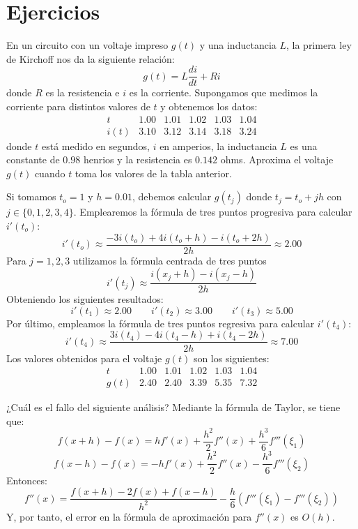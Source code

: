 \section{Ejercicios}
\begin{ejer}
En un circuito con un voltaje impreso $g(t)$ y una inductancia $L$, la primera ley de Kirchoff nos da la siguiente relación:
$$g(t)=L \dfrac{di}{dt}+Ri$$
donde $R$ es la resistencia e $i$ es la corriente. Supongamos que medimos la corriente para distintos valores de $t$ y obtenemos los datos:
$$\begin{array}{c|c|c|c|c|c}
    t & 1.00&1.01 &1.02&1.03&1.04  \\
    \hline
    i(t) & 3.10 &3.12 &3.14&3.18&3.24 
\end{array}$$
donde $t$ está medido en segundos, $i$ en amperios, la inductancia $L$ es una constante de $0.98$ henrios y la resistencia es $0.142$ ohms. Aproxima el voltaje $g(t)$ cuando $t$ toma los valores de la tabla anterior.
\end{ejer}
\begin{sol}
Si tomamos $t_o=1$ y $h=0.01$, debemos calcular $g(t_j)$ donde $t_j=t_o+jh$ con $j\in\{0,1,2,3,4\}$. Emplearemos la fórmula de tres puntos progresiva para calcular $i'(t_o)$:
$$i'(t_o)\approx\frac{-3i(t_o)+4i(t_o+h)-i(t_o+2h)}{2h}\approx 2.00$$
Para $j=1,2,3$ utilizamos la fórmula centrada de tres puntos
$$i'(t_j)\approx\dfrac{i(x_j+h)-i(x_j-h)}{2h}$$
Obteniendo los siguientes resultados:
$$i'(t_1)\approx 2.00\qquad i'(t_2) \approx 3.00 \qquad i'(t_3)\approx 5.00$$
Por último, empleamos la fórmula de tres puntos regresiva para calcular $i'(t_4)$:
$$i'(t_4)\approx\frac{3i(t_4)-4i(t_4-h)+i(t_4-2h)}{2h}\approx 7.00$$
Los valores obtenidos para el voltaje $g(t)$ son los siguientes:
$$\begin{array}{c|c|c|c|c|c}
    t & 1.00&1.01 &1.02&1.03&1.04  \\
    \hline
    g(t) & 2.40 &2.40 &3.39&5.35&7.32
\end{array}$$
\end{sol}
\begin{ejer}
¿Cuál es el fallo del siguiente análisis? Mediante la fórmula de Taylor, se tiene que:
$$f(x+h)-f(x)=hf'(x)+\dfrac{h^2}{2}f''(x)+\dfrac{h^3}{6}f'''(\xi_1)$$
$$f(x-h)-f(x)=-hf'(x)+\dfrac{h^2}{2}f''(x)-\dfrac{h^3}{6}f'''(\xi_2)$$
Entonces:
$$f''(x)=\dfrac{f(x+h)-2f(x)+f(x-h)}{h^2}-\dfrac{h}{6}(f'''(\xi_1)-f'''(\xi_2))$$
Y, por tanto, el error en la fórmula de aproximación para $f''(x)$ es $O(h)$.
\end{ejer}
